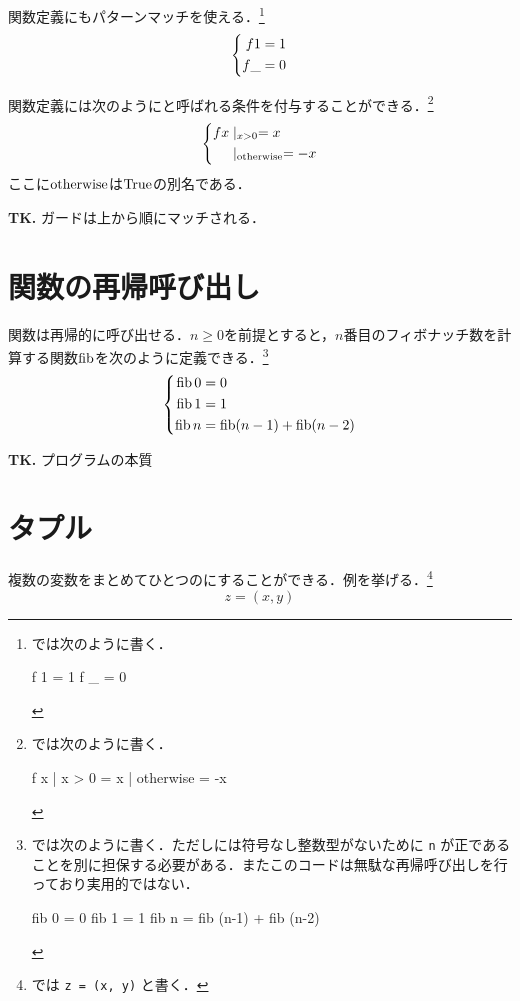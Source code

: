 \documentclass[platex,a5paper,twoside,fleqn,draft]{jsbook}
\newcommand{\keyword}[1]{\textgt{\textbf{#1}}}
\newcommand{\tobewritten}[1]{\begin{screen}\textbf{TK.} {#1}\end{screen}}
\begin{document}
関数定義にもパターンマッチを使える．\footnote{\haskell では次のように書く．
\begin{footcode}
      f 1 = 1
      f _ = 0
\end{footcode}}
\begin{equation}
\left\{\begin{aligned}f1&=1\\f\_&=0\end{aligned}\right.
\end{equation}

関数定義には次のように\keyword{ガード}と呼ばれる条件を付与することができる．\footnote{\haskell では次のように書く．
\begin{footcode}
      f x | x > 0     = x
          | otherwise = -x
\end{footcode}}
\begin{equation}
\left\{\begin{aligned}fx&\mid_{x>0}=x\\&\mid_{\mathrel{\textrm{otherwise}}}=-x\end{aligned}\right.
\end{equation}
ここに$\mathrel{\textrm{otherwise}}$は$\mathord{\mathrm{True}}$の別名である．

\tobewritten{ガードは上から順にマッチされる．}

\section{関数の再帰呼び出し}

関数は再帰的に呼び出せる．$n\ge0$を前提とすると，$n$番目のフィボナッチ数を計算する関数$\mathop{\textrm{fib}}$を次のように定義できる．\footnote{\haskell では次のように書く．ただし\haskell には符号なし整数型がないために \verb|n| が正であることを別に担保する必要がある．またこのコードは無駄な再帰呼び出しを行っており実用的ではない．
\begin{footcode}
      fib 0 = 0
      fib 1 = 1
      fib n = fib (n-1) + fib (n-2)
\end{footcode}}
\begin{equation}
\left\{
\begin{aligned}
\mathop{\textrm{fib}} 0&=0\\
\mathop{\textrm{fib}} 1&=1\\
\mathop{\textrm{fib}} n&=\mathop{\textrm{fib}}(n-1)+\mathop{\textrm{fib}}(n-2)
\end{aligned}
\right.
\end{equation}

\tobewritten{プログラムの本質}

\section{タプル}

複数の変数をまとめてひとつの\keyword{タプル}にすることができる．例を挙げる．\footnote{\haskell では \verb|z = (x, y)| と書く．}
\begin{equation}
z=(x,y)
\end{equation}
\end{document}
